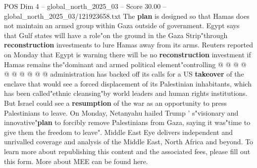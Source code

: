 \begin{textsample}{POS Dim 4 – global\_north\_2025\_03 – Score 30.00 – global\_north\_2025\_03/121923658.txt}
The \textbf{plan} is designed so that Hamas does not maintain an armed group within Gaza outside of government.
Egypt says that Gulf states will have a role"on the ground in the Gaza Strip"through \textbf{reconstruction} investments to lure Hamas away from its arms.
Reuters reported on Monday that Egypt is warning there will be no \textbf{reconstruction} investment if Hamas remains the"dominant and armed political element"controlling @ @ @ @ @ @ @ @ @ @ administration has backed off its calls for a US \textbf{takeover} of the enclave that would see a forced displacement of its Palestinian inhabitants, which has been called"ethnic cleansing"by world leaders and human rights institutions.
But Israel could see a \textbf{resumption} of the war as an opportunity to press Palestinians to leave.
On Monday, Netanyahu hailed Trump ' s"visionary and innovative"\textbf{plan} to forcibly remove Palestinians from Gaza, saying it was"time to give them the freedom to leave".
Middle East Eye delivers independent and unrivalled coverage and analysis of the Middle East, North Africa and beyond.
To learn more about republishing this content and the associated fees, please fill out this form.
More about MEE can be found here.

\end{textsample}
